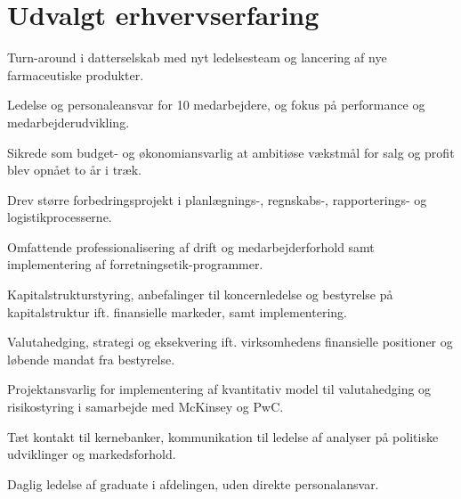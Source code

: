 \documentclass[a4paper]{janus-resume}
\begin{document}
\hfill
%
%
\begin{minipage}[t]{0.49\textwidth} %


\section{Udvalgt erhvervserfaring}


\vspace{\topsep} %
\begin{tightitemize}
\item Turn-around i datterselskab med nyt ledelsesteam og lancering af nye farmaceutiske produkter. 
\item Ledelse og personaleansvar for 10 medarbejdere, og fokus på performance og medarbejderudvikling.
\item Sikrede som budget- og økonomiansvarlig at ambitiøse vækstmål for salg og profit blev opnået to år i træk.
\item Drev større forbedringsprojekt i planlægnings-, regnskabs-, rapporterings- og logistikprocesserne.
\item Omfattende professionalisering af drift og medarbejderforhold samt implementering af forretningsetik-programmer. 
\end{tightitemize}

\sectionspace %



\begin{tightitemize}
\item Kapitalstrukturstyring, anbefalinger til koncernledelse og bestyrelse på kapitalstruktur ift. finansielle markeder, samt
implementering.
\item Valutahedging, strategi og eksekvering ift. virksomhedens finansielle positioner og løbende mandat fra bestyrelse.
\item Projektansvarlig for implementering af kvantitativ model til valutahedging og risikostyring i samarbejde med McKinsey og PwC. 
\item Tæt kontakt til kernebanker, kommunikation til ledelse af analyser på politiske udviklinger og markedsforhold.
\item Daglig ledelse af graduate i afdelingen, uden direkte personalansvar.
\end{tightitemize}


\end{minipage}
\end{document}
